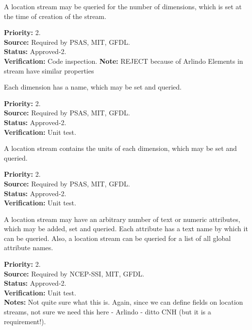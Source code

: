 A location stream may be queried for the number of dimensions, which is
set at the time of creation of the stream.
\begin{reqlist}
{\bf Priority:} 2. \\
{\bf Source:} Required by PSAS, MIT, GFDL.\\
{\bf Status:} Approved-2. \\
{\bf Verification:} Code inspection.
{\bf Note:} REJECT because of Arlindo {Elements in stream have similar properties}
\end{reqlist}

Each dimension has a name, which may be set and queried.
\begin{reqlist}
{\bf Priority:} 2. \\
{\bf Source:} Required by PSAS, MIT, GFDL.\\
{\bf Status:} Approved-2. \\
{\bf Verification:} Unit test.
\end{reqlist}

A location stream contains the units of each dimension, which may be set and queried.
\begin{reqlist}
{\bf Priority:} 2. \\
{\bf Source:} Required by PSAS, MIT, GFDL.\\
{\bf Status:} Approved-2. \\
{\bf Verification:} Unit test.
\end{reqlist}


A location stream may have an arbitrary number of text or numeric attributes,
which may be added, set and queried.  Each attribute has a text name by which it
can be queried.  Also, a location stream can be queried for a list of all global
attribute names.

\begin{reqlist}
{\bf Priority:} 2. \\
{\bf Source:} Required by NCEP-SSI, MIT, GFDL. \\
{\bf Status:} Approved-2. \\
{\bf Verification:} Unit test. \\
{\bf Notes:} Not quite sure what this is. Again, since we can define fields on location streams, not sure we need this here - Arlindo - ditto CNH (but it is a requirement!).
\end{reqlist}

